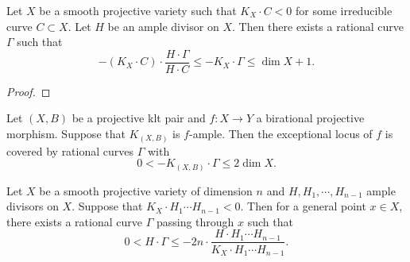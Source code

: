     \begin{theorem}\label{thm:rational_curve_on_smooth_variety_with_not_nef_K}
        Let \(X\) be a smooth projective variety such that \(K_X \cdot C < 0\) for some irreducible curve \(C \subset X\).
        Let \(H\) be an ample divisor on \(X\).
        Then there exists a rational curve \(\Gamma\) such that
        \[ -(K_X \cdot C) \cdot \frac{H\cdot \Gamma}{H \cdot C} \leq -K_X \cdot \Gamma \leq \dim X + 1. \]
    \end{theorem}
    \begin{proof}
    \end{proof}

    \begin{theorem}\label{thm:rational_curve_on_exceptional_locus}
        Let \((X,B)\) be a projective klt pair and \(f:X \to Y\) a birational projective morphism.
        Suppose that \(K_{(X,B)}\) is \(f\)-ample.
        Then the exceptional locus of \(f\) is covered by rational curves \(\Gamma\) with 
        \[ 0 < -K_{(X,B)} \cdot \Gamma \leq 2\dim X. \]
    \end{theorem}

    \begin{theorem}\label{thm:general_rational_curve_on_smooth_variety_with_negative_intersection}
        Let \(X\) be a smooth projective variety of dimension \(n\) and \(H, H_1,\cdots,H_{n-1}\) ample divisors on \(X\).
        Suppose that \(K_X\cdot H_1 \cdots H_{n-1} < 0\).
        Then for a general point \(x\in X\), there exists a rational curve \(\Gamma\) passing through \(x\) such that
        \[ 0 < H \cdot \Gamma \leq - 2n \cdot \frac{H\cdot H_1 \cdots H_{n-1}}{K_X \cdot H_1 \cdots H_{n-1}}. \]
    \end{theorem}

